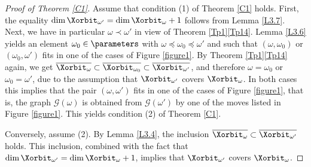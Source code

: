 \begin{proof}[Proof of Theorem \ref{C1}]
Assume that condition (1) of Theorem \ref{C1} holds.
First, the equality
$\dim\Xorbit_{\omega'}=\dim\Xorbit_\omega+1$
follows from Lemma \ref{L3.7}.
Next, we have in particular $\omega\prec\omega'$ in view of Theorem \ref{Tp1}\ref{Tp14}. Lemma \ref{L3.6} yields an element $\omega_0\in\parameters$ with $\omega\preceq\omega_0\preceq\omega'$ and such that $(\omega,\omega_0)$ or $(\omega_0,\omega')$ fits in one of the cases of Figure \ref{figure1}. By Theorem \ref{Tp1}\ref{Tp14} again, we get $\overline{\Xorbit_\omega}\subset\overline{\Xorbit_{\omega_0}}\subset\overline{\Xorbit_{\omega'}}$, and therefore $\omega=\omega_0$ or $\omega_0=\omega'$, due to the assumption that $\Xorbit_{\omega'}$ covers $\Xorbit_\omega$. In both cases this implies that the pair $(\omega,\omega')$ fits in one of the cases of Figure \ref{figure1}, that is, the graph $\mathcal{G}(\omega)$ is obtained from $\mathcal{G}(\omega')$ by one of the moves listed in Figure \ref{figure1}. This yields condition (2) of Theorem \ref{C1}.

Conversely, assume (2). By Lemma \ref{L3.4}, the inclusion $\overline{\Xorbit_\omega}\subset\overline{\Xorbit_{\omega'}}$ holds. This inclusion, combined with the fact that $\dim\Xorbit_{\omega'}=\dim\Xorbit_\omega+1$, implies that $\Xorbit_{\omega'}$ covers $\Xorbit_\omega$.
\end{proof}

